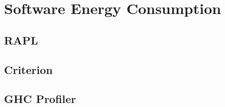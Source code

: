 \chapter{Software Energy Consumption}

\section{RAPL}
\lipsum[1-3]


\section{Criterion}
\lipsum[1-4]


\section{GHC Profiler}
\lipsum[1-4]
